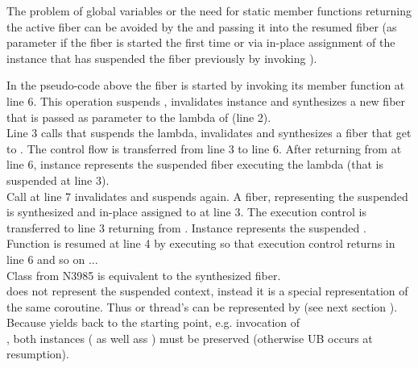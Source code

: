 \label{solution_gpub}


\label{synthesizing}
The problem of global variables or the need for static member functions
returning the active fiber can be avoided by  the
 and passing it into the resumed fiber (as parameter if the
fiber is started the first time or via in-place assignment of the instance that
has suspended the fiber previously by invoking \resume).

In the pseudo-code above the fiber  is started by invoking its member
function \resume at line 6. This operation suspends , invalidates
instance  and synthesizes a new fiber  that is passed as parameter
to the lambda of  (line 2).\\
Line 3 calls  that suspends the lambda, invalidates  and
synthesizes a fiber that get  to . The control
flow is transferred from line 3 to line 6. After returning from 
at line 6, instance  represents the suspended fiber executing the lambda
(that is suspended at line 3).\\
Call  at line 7 invalidates  and suspends 
again. A fiber, representing the suspended  is synthesized and
in-place assigned to  at line 3. The execution control is transferred to
line 3 returning from . Instance  represents the
suspended .\\
Function  is resumed at line 4 by executing  so that
execution control returns in line 6 and so on ...\\

Class  from  N3985\cite{N3985} is
 equivalent to the synthesized fiber.\\
 does not represent the suspended context,
instead it is a special representation of the same coroutine. Thus \main or
thread's \entryfn\xspace can  be represented by 
(see next section ).\\
Because  yields back to the starting
point, e.g. invocation of\\
,
both instances ( as well ass ) must be preserved
(otherwise UB occurs at resumption).\\


